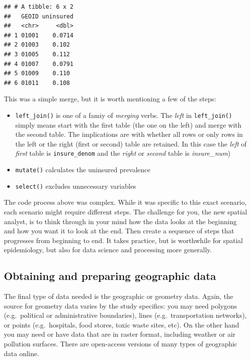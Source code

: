 \documentclass[
]{book}
\providecommand{\tightlist}{%
  \setlength{\itemsep}{0pt}\setlength{\parskip}{0pt}}
\newenvironment{rmdnote}[1]
  {
  \begin{itemize}
  \renewcommand{\labelitemi}{
    \raisebox{-.7\height}[0pt][0pt]{
      {\setkeys{Gin}{width=3em,keepaspectratio}\texttt{[image: images/\#1]}}
    }
  }
  \setlength{\fboxsep}{1em}
  \begin{note}
  \item
  }
  {
  \end{note}
  \end{itemize}
  }
\begin{document}
\begin{verbatim}
## # A tibble: 6 x 2
##   GEOID uninsured
##   <chr>     <dbl>
## 1 01001    0.0714
## 2 01003    0.102 
## 3 01005    0.112 
## 4 01007    0.0791
## 5 01009    0.110 
## 6 01011    0.108
\end{verbatim}

This was a simple merge, but it is worth mentioning a few of the steps:

\begin{itemize}
\tightlist
\item
  \texttt{left\_join()} is one of a famiy of \emph{merging} verbs. The \emph{left} in \texttt{left\_join()} simply means start with the first table (the one on the left) and merge with the second table. The implications are with whether all rows or only rows in the left or the right (first or second) table are retained. In this case the \emph{left} of \emph{first} table is \texttt{insure\_denom} and the \emph{right} or \emph{second} table is \emph{insure\_num})
\item
  \texttt{mutate()} calculates the uninsured prevalence
\item
  \texttt{select()} excludes unnecessary variables
\end{itemize}

\begin{rmdnote}{note}
The code process above was complex. While it was specific to this exact scenario, each scenario might require different steps. The challenge for you, the new spatial analyst, is to think through in your mind how the data looks at the beginning and how you want it to look at the end. Then create a sequence of steps that progresses from beginning to end. It takes practice, but is worthwhile for spatial epidemiology, but also for data science and processing more generally.

\end{rmdnote}

\hypertarget{obtaining-and-preparing-geographic-data}{%
\subsection{Obtaining and preparing geographic data}\label{obtaining-and-preparing-geographic-data}}

The final type of data needed is the geographic or geometry data. Again, the source for geometry data varies by the study specifics: you may need polygons (e.g.~political or administrative boundaries), lines (e.g.~transportation networks), or points (e.g.~hospitals, food stores, toxic waste sites, etc). On the other hand you may need or have data that are in raster format, including weather or air pollution surfaces. There are open-access versions of many types of geographic data online.
\end{document}
